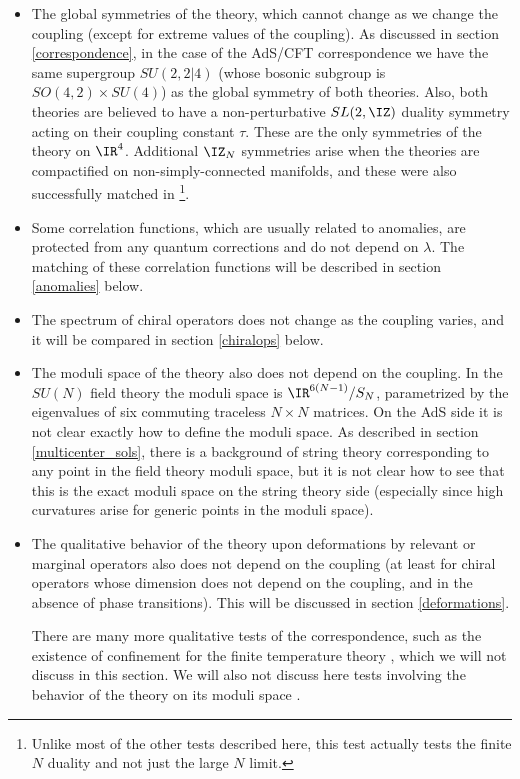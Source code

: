 \begin{itemize}
\item{} The global symmetries of the theory, which cannot change as we
change the coupling (except for extreme values of the coupling). As
discussed in section \ref{correspondence}, 
in the case of the AdS/CFT correspondence we
have the same supergroup $SU(2,2|4)$ (whose bosonic subgroup is
$SO(4,2)\times SU(4)$) as the global symmetry of both theories. Also,
both theories are believed to have a non-perturbative $SL(2,\IZ)$
duality symmetry acting on their coupling constant $\tau$. These are
the only symmetries of the theory on $\IR^4$. Additional $\IZ_N$
symmetries arise when the theories are compactified on
non-simply-connected manifolds, and these were also successfully
matched in \cite{Aharony:1998qu,Witten:1998wy}\footnote{Unlike 
most of the other tests described
here, this test actually tests the finite $N$ duality and not just the
large $N$ limit.}.

\item{} Some correlation functions, which are usually related to
anomalies, are protected from any quantum corrections and do not
depend on $\lambda$. The matching of these correlation functions will
be described in section \ref{anomalies} below.

\item{} The spectrum of chiral operators does not change as the
coupling varies, and it will be compared in section \ref{chiralops}
below.

\item{} The moduli space of the theory also does not depend on the
coupling. In the $SU(N)$ field theory the moduli space is
$\IR^{6(N-1)}/S_N$, parametrized by the eigenvalues of six commuting
traceless $N\times N$ matrices. On the AdS side it is not clear
exactly how to define the moduli space. As described in section 
\ref{multicenter_sols},
there is a background of string theory corresponding to any point in
the field theory moduli space, but it is not clear how to see that
this is the exact moduli space on the string theory side (especially
since high curvatures arise for generic points in the moduli space).

\item{} The qualitative behavior of the theory upon deformations by
relevant or marginal operators also does not depend on the coupling
(at least for chiral operators whose dimension does not depend on the
coupling, and in the absence of phase transitions). This will be
discussed in section \ref{deformations}. 

There are many more
qualitative tests of the correspondence, such as the existence of
confinement for the finite temperature theory \cite{Witten:1998zw},
which we will not discuss in this section. We will also not discuss
here tests involving the behavior of the theory on its moduli space
\cite{Douglas:1998tk,Gonzalez-Rey:1998uh,Das:1999ij}.

\end{itemize}

